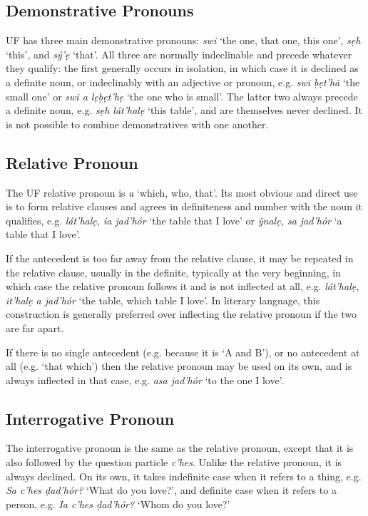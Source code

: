\documentclass[a4paper, 12pt, twoside, openright, final]{book}
\let \w \textit
\begin{document}
\subsection{Demonstrative Pronouns}
UF has three main demonstrative pronouns: \w{swi} ‘the one, that one, this one’, \w{sẹh} ‘this’, and \w{sý’ẹ} ‘that’. All
three are normally indeclinable and precede whatever they qualify: the first generally occurs in isolation, in which
case it is declined as a definite noun, or indeclinably with an adjective or pronoun, e.g. \w{swi ḅẹt’hâ} ‘the small one’
or \w{swi a lẹḅẹt’hẹ} ‘the one who is small’. The latter two always precede a definite noun, e.g. \w{sẹh lát’halẹ} ‘this table’,
and are themselves never declined. It is not possible to combine demonstratives with one another.

\subsection{Relative Pronoun}
The UF relative pronoun is \w{a} ‘which, who, that’. Its most obvious and direct use is to form relative
clauses and agrees in definiteness and number with the noun it qualifies, e.g. \w{lát’halẹ, ia jad’hór} ‘the
table that I love’ or \w{ŷnalẹ, sa jad’hór} ‘a table that I love’.

If the antecedent is too far away from the relative clause, it may be repeated in the relative clause,
usually in the definite, typically at the very beginning, in which case the relative pronoun follows it and is not inflected at
all, e.g. \w{lát’halẹ, it’halẹ a jad’hór} ‘the table, which table I love’. In literary language, this
construction is generally preferred over inflecting the relative pronoun if the two are far apart.

If there is no single antecedent (e.g. because it is ‘A and B’), or no antecedent at all (e.g. ‘that which’) then the
relative pronoun may be used on its own, and is always inflected in that case, e.g.  \w{asa jad’hór} ‘to the
one I love’.

\subsection{Interrogative Pronoun}
The interrogative pronoun is the same as the relative pronoun, except that it is also followed by the
question particle \w{c’hes}. Unlike the relative pronoun, it is always declined. On its own, it takes
indefinite case when it refers to a thing, e.g. \w{Sa c’hes ḍad’hór?} ‘What do you love?’, and definite
case when it refers to a person, e.g. \w{Ia c’hes ḍad’hór?} ‘Whom do you love?’
\end{document}

